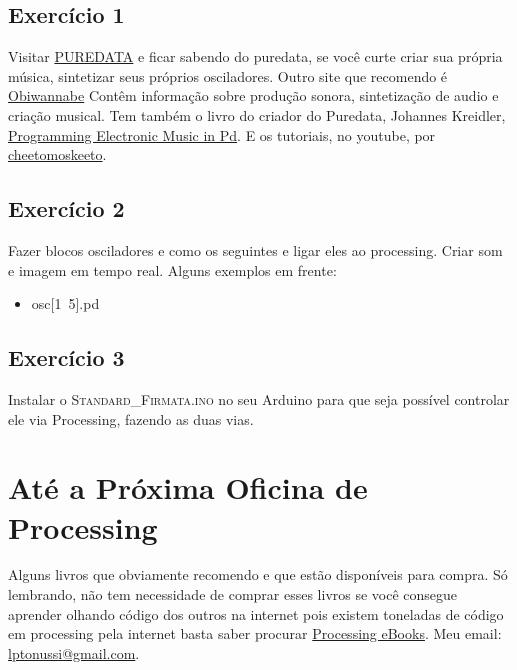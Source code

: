 \documentclass[12pt]{article}
\begin{document}
\subsection{Exercício 1}

\qquad Visitar \href{http://puredata.info/}{PUREDATA} e ficar sabendo do puredata, se você curte criar sua própria música, sintetizar seus próprios osciladores. Outro site que recomendo é \href{http://obiwannabe.co.uk/}{Obiwannabe} Contêm informação sobre produção sonora, sintetização de audio e criação musical. Tem também o livro do criador do Puredata, Johannes Kreidler, \href{http://www.pd-tutorial.com/}{Programming Electronic Music in Pd}. E os tutoriais, no youtube, por \href{http://www.youtube.com/playlist?list=PL12DC9A161D8DC5DC}{cheetomoskeeto}.

\subsection{Exercício 2}

\qquad Fazer blocos osciladores e como os seguintes e ligar eles ao processing. Criar som e imagem em tempo real. Alguns exemplos em frente:

\begin{itemize}
\item osc[1~5].pd
\end{itemize}

\subsection{Exercício 3}

\qquad Instalar o \textsc{Standard\_Firmata.ino} no seu Arduino para que seja possível controlar ele via Processing, fazendo as duas vias.


\section{Até a Próxima Oficina de Processing}

\qquad Alguns livros que obviamente recomendo e que estão disponíveis para compra. Só lembrando, não tem necessidade de comprar esses livros se você consegue aprender olhando código dos outros na internet pois existem toneladas de código em processing pela internet basta saber procurar \href{http://www.processing.org/learning/books/}{Processing eBooks}. Meu email: \href{mailto:lptonussi@gmail.com}{lptonussi@gmail.com}.
\end{document}
